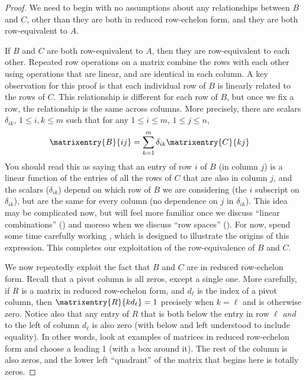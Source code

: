 \begin{proof}
We need to begin with no assumptions about any relationships between $B$ and $C$, other than they are both in reduced row-echelon form, and they are both row-equivalent to $A$.\par
%
If $B$ and $C$ are both row-equivalent to $A$, then they are row-equivalent to each other.  Repeated row operations on a matrix combine the rows with each other using operations that are linear, and are identical in each column.  A key observation for this proof is that each individual row of $B$ is linearly related to the rows of $C$.  This relationship is different for each row of $B$, but once we fix a row, the relationship is the same across columns.  More precisely, there are scalars $\delta_{ik}$, $1\leq i,k\leq m$ such that for any $1\leq i\leq m$, $1\leq j\leq n$,
%
\begin{align*}
\matrixentry{B}{ij}
&=\sum_{k=1}^{m}\delta_{ik}\matrixentry{C}{kj}
\end{align*}
%
You should read this as saying that an entry of row $i$ of $B$ (in column $j$) is a linear function of the entries of all the rows of $C$ that are also in column $j$, and the scalars ($\delta_{ik}$) depend on which row of $B$ we are considering (the $i$ subscript on $\delta_{ik}$), but are the same for every column (no dependence on $j$ in $\delta_{ik}$).  This idea may be complicated now, but will feel more familiar once we discuss ``linear combinations'' () and moreso when we discuss ``row spaces'' ().  For now, spend some time carefully working , which is designed to illustrate the origins of this expression.  This completes our exploitation of the row-equivalence of $B$ and $C$.\par
%
We now repeatedly exploit the fact that $B$ and $C$ are in reduced row-echelon form.  Recall that a pivot column is all zeros, except a single one.  More carefully, if $R$ is a matrix in reduced row-echelon form, and $d_\ell$ is the index of a pivot column, then $\matrixentry{R}{kd_\ell}=1$ precisely when $k=\ell$ and is otherwise zero.  Notice also that any entry of $R$ that is both below the entry in row $\ell$ {\em and} to the left of column $d_\ell$ is also zero (with below and left understood to include equality).  In other words, look at examples of matrices in reduced row-echelon form and choose a leading 1 (with a box around it).  The rest of the column is also zeros, and the lower left ``quadrant'' of the matrix that begins here is totally zeros.\par

\end{proof}
